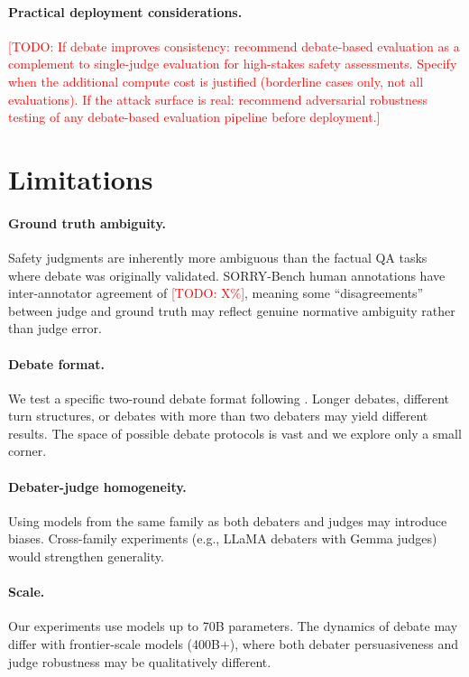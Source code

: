 \documentclass[preprint]{article}
\newcommand{\todo}[1]{\textcolor{red}{[TODO: #1]}}
\begin{document}
\paragraph{Practical deployment considerations.} \todo{If debate improves consistency: recommend debate-based evaluation as a complement to single-judge evaluation for high-stakes safety assessments. Specify when the additional compute cost is justified (borderline cases only, not all evaluations). If the attack surface is real: recommend adversarial robustness testing of any debate-based evaluation pipeline before deployment.}

\section{Limitations}
\label{sec:limitations}

\paragraph{Ground truth ambiguity.} Safety judgments are inherently more ambiguous than the factual QA tasks where debate was originally validated. SORRY-Bench human annotations have inter-annotator agreement of \todo{X\%}, meaning some ``disagreements'' between judge and ground truth may reflect genuine normative ambiguity rather than judge error.

\paragraph{Debate format.} We test a specific two-round debate format following \citet{khan2024debating}. Longer debates, different turn structures, or debates with more than two debaters may yield different results. The space of possible debate protocols is vast and we explore only a small corner.

\paragraph{Debater-judge homogeneity.} Using models from the same family as both debaters and judges may introduce biases. Cross-family experiments (e.g., LLaMA debaters with Gemma judges) would strengthen generality.

\paragraph{Scale.} Our experiments use models up to 70B parameters. The dynamics of debate may differ with frontier-scale models (400B+), where both debater persuasiveness and judge robustness may be qualitatively different.
\end{document}
